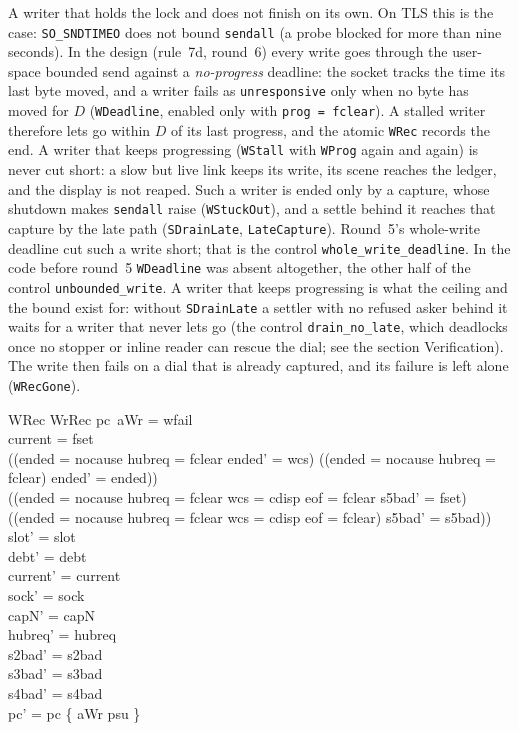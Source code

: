 \documentclass[a4paper,10pt,fleqn]{article}
\begin{document}
A writer that holds the lock and does not finish on its own.  On TLS this is
the case: \texttt{SO\_SNDTIMEO} does not bound \texttt{sendall} (a probe blocked
for more than nine seconds).  In the design (rule~7d, round~6) every write goes
through the user-space bounded send against a \emph{no-progress} deadline: the
socket tracks the time its last byte moved, and a writer fails as
\texttt{unresponsive} only when no byte has moved for $D$ (\texttt{WDeadline},
enabled only with \texttt{prog = fclear}).  A stalled writer therefore lets go
within $D$ of its last progress, and the atomic \texttt{WRec} records the end.
A writer that keeps progressing (\texttt{WStall} with \texttt{WProg} again and
again) is never cut short: a slow but live link keeps its write, its scene
reaches the ledger, and the display is not reaped.  Such a writer is ended only
by a capture, whose shutdown makes \texttt{sendall} raise (\texttt{WStuckOut}),
and a settle behind it reaches that capture by the late path
(\texttt{SDrainLate}, \texttt{LateCapture}).  Round~5's whole-write deadline
cut such a write short; that is the control \texttt{whole\_write\_deadline}.  In
the code before round~5 \texttt{WDeadline} was absent altogether, the other half
of the control \texttt{unbounded\_write}.  A writer that keeps progressing is
what the ceiling and the bound exist for: without \texttt{SDrainLate} a settler with no refused asker behind it
waits for a writer that never lets go (the control \texttt{drain\_no\_late},
which deadlocks once no stopper or inline reader can rescue the dial; see the
section Verification).
The write then fails on a dial that is already captured, and its failure is
left alone (\texttt{WRecGone}).

\begin{schema}{WRec}
  WrRec
\where
  pc~aWr = wfail \\
  current = fset \\
  ((ended = nocause \land hubreq = fclear \land ended' = wcs) \lor
    (\lnot (ended = nocause \land hubreq = fclear) \land ended' = ended)) \\
  ((ended = nocause \land hubreq = fclear \land wcs = cdisp \land eof = fclear \land
      s5bad' = fset) \lor
    (\lnot (ended = nocause \land hubreq = fclear \land wcs = cdisp \land
      eof = fclear) \land s5bad' = s5bad)) \\
  slot' = slot \\
  debt' = debt \\
  current' = current \\
  sock' = sock \\
  capN' = capN \\
  hubreq' = hubreq \\
  s2bad' = s2bad \\
  s3bad' = s3bad \\
  s4bad' = s4bad \\
  pc' = pc \oplus \{ aWr \mapsto psu \}
\end{schema}
\end{document}
